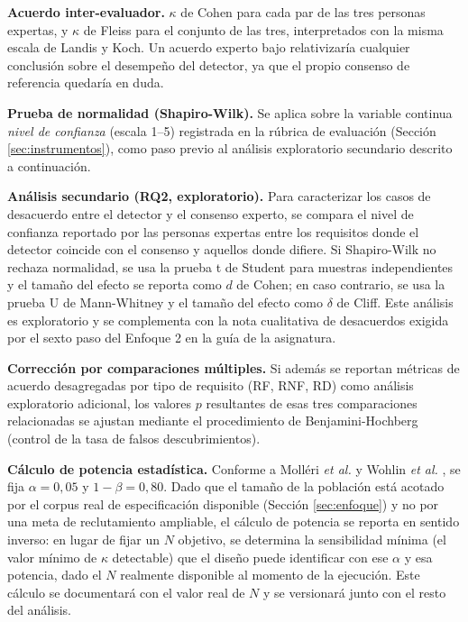 \documentclass[journal,onecolumn]{IEEEtran}
\begin{document}
	\textbf{Acuerdo inter-evaluador.} $\kappa$ de Cohen \cite{cohen1960} para
	cada par de las tres personas expertas, y $\kappa$ de Fleiss
	\cite{fleiss1971} para el conjunto de las tres, interpretados con la misma
	escala de Landis y Koch. Un acuerdo experto bajo relativizaría cualquier
	conclusión sobre el desempeño del detector, ya que el propio consenso de
	referencia quedaría en duda.
	
	\textbf{Prueba de normalidad (Shapiro-Wilk).} Se aplica sobre la variable
	continua \emph{nivel de confianza} (escala 1--5) registrada en la rúbrica
	de evaluación (Sección \ref{sec:instrumentos}), como paso previo al
	análisis exploratorio secundario descrito a continuación.
	
	\textbf{Análisis secundario (RQ2, exploratorio).} Para caracterizar los
	casos de desacuerdo entre el detector y el consenso experto, se compara el
	nivel de confianza reportado por las personas expertas entre los
	requisitos donde el detector coincide con el consenso y aquellos donde
	difiere. Si Shapiro-Wilk no rechaza normalidad, se usa la prueba t de
	Student para muestras independientes y el tamaño del efecto se reporta
	como $d$ de Cohen; en caso contrario, se usa la prueba U de Mann-Whitney y
	el tamaño del efecto como $\delta$ de Cliff. Este análisis es exploratorio
	y se complementa con la nota cualitativa de desacuerdos exigida por el
	sexto paso del Enfoque 2 en la guía de la asignatura.
	
	\textbf{Corrección por comparaciones múltiples.} Si además se reportan
	métricas de acuerdo desagregadas por tipo de requisito (RF, RNF, RD) como
	análisis exploratorio adicional, los valores $p$ resultantes de esas tres
	comparaciones relacionadas se ajustan mediante el procedimiento de
	Benjamini-Hochberg (control de la tasa de falsos descubrimientos).
	
	\textbf{Cálculo de potencia estadística.} Conforme a Molléri \emph{et al.}
	\cite{molleri2020} y Wohlin \emph{et al.} \cite{wohlin2012}, se fija
	$\alpha = 0{,}05$ y $1 - \beta = 0{,}80$. Dado que el tamaño de la
	población está acotado por el corpus real de especificación disponible
	(Sección \ref{sec:enfoque}) y no por una meta de reclutamiento ampliable,
	el cálculo de potencia se reporta en sentido inverso: en lugar de fijar un
	$N$ objetivo, se determina la sensibilidad mínima (el valor mínimo de
	$\kappa$ detectable) que el diseño puede identificar con ese $\alpha$ y
	esa potencia, dado el $N$ realmente disponible al momento de la ejecución.
	Este cálculo se documentará con el valor real de $N$ y se versionará junto
	con el resto del análisis.
	
\end{document}
